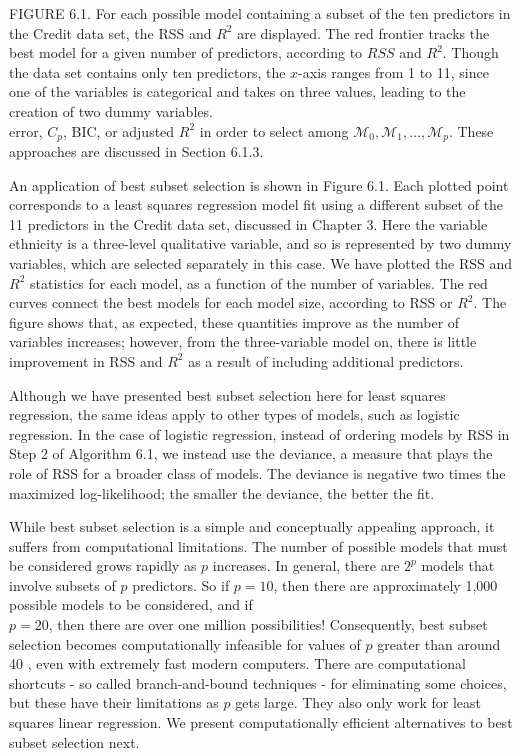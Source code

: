 \documentclass[10pt]{article}
\begin{document}
FIGURE 6.1. For each possible model containing a subset of the ten predictors in the Credit data set, the RSS and $R^{2}$ are displayed. The red frontier tracks the best model for a given number of predictors, according to $R S S$ and $R^{2}$. Though the data set contains only ten predictors, the $x$-axis ranges from 1 to 11, since one of the variables is categorical and takes on three values, leading to the creation of two dummy variables.\\
error, $C_{p}$, BIC, or adjusted $R^{2}$ in order to select among $\mathcal{M}_{0}, \mathcal{M}_{1}, \ldots, \mathcal{M}_{p}$. These approaches are discussed in Section 6.1.3.

An application of best subset selection is shown in Figure 6.1. Each plotted point corresponds to a least squares regression model fit using a different subset of the 11 predictors in the Credit data set, discussed in Chapter 3. Here the variable ethnicity is a three-level qualitative variable, and so is represented by two dummy variables, which are selected separately in this case. We have plotted the RSS and $R^{2}$ statistics for each model, as a function of the number of variables. The red curves connect the best models for each model size, according to RSS or $R^{2}$. The figure shows that, as expected, these quantities improve as the number of variables increases; however, from the three-variable model on, there is little improvement in RSS and $R^{2}$ as a result of including additional predictors.

Although we have presented best subset selection here for least squares regression, the same ideas apply to other types of models, such as logistic regression. In the case of logistic regression, instead of ordering models by RSS in Step 2 of Algorithm 6.1, we instead use the deviance, a measure that plays the role of RSS for a broader class of models. The deviance is negative two times the maximized log-likelihood; the smaller the deviance, the better the fit.

While best subset selection is a simple and conceptually appealing approach, it suffers from computational limitations. The number of possible models that must be considered grows rapidly as $p$ increases. In general, there are $2^{p}$ models that involve subsets of $p$ predictors. So if $p=10$, then there are approximately 1,000 possible models to be considered, and if\\
$p=20$, then there are over one million possibilities! Consequently, best subset selection becomes computationally infeasible for values of $p$ greater than around 40 , even with extremely fast modern computers. There are computational shortcuts - so called branch-and-bound techniques - for eliminating some choices, but these have their limitations as $p$ gets large. They also only work for least squares linear regression. We present computationally efficient alternatives to best subset selection next.
\end{document}
